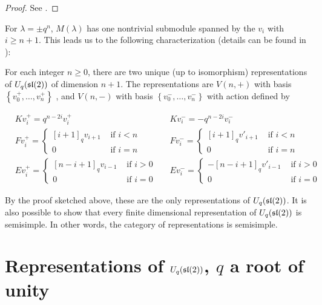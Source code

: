 \begin{proof}
    See \cite{Jantzen1996}.
\end{proof}

For $\lambda = \pm q^{n}$, $M(\lambda)$ has one nontrivial submodule spanned by the $v_i$ with $i \geq n+1$.
This leads us to the following characterization (details can be found in \cite{Jantzen1996}):


For each integer $n \geq 0$, there are two unique (up to isomorphism)
representations of $U_q(\mathfrak{sl}(2))$ of dimension $n+1$. 
The representations are $V(n,+)$ with basis $\left\{ v^+_0, \ldots, v^+_n
\right\}$ , and $V(n,-)$ with basis $\left\{ v^-_0, \ldots, v^-_n \right\}$
with action defined by 

\begin{align*}
    &K v^+_i = q^{n-2i} v^+_i  &
    &K v^-_i = -q^{n-2i} v^-_i \\
    &F v^+_i = \begin{cases} [i+1]_qv_{i+1}& \text{ if $i < n$} \\ 0& \text{ if $i = n$} \end{cases} &
    &F v^-_i = \begin{cases} [i+1]_qv'_{i+1}& \text{ if $i < n$} \\ 0& \text{ if $i = n$} \end{cases} \\
    &E v^+_i = \begin{cases} 
                     [n-i+1]_qv_{i-1}& \text{ if $i > 0$} \\ 
                    0& \text{ if $i = 0$} 
             \end{cases} &
    &E v^-_i = \begin{cases} 
                    -[n-i+1]_q v'_{i-1}& \text{ if $i > 0$} \\ 
                    0& \text{ if $i = 0$} 
             \end{cases}
\end{align*}

By the proof sketched above, these are the only representations of
$U_q(\mathfrak{sl}(2))$. It is also possible to show that every finite dimensional
representation of $U_q(\mathfrak{sl}(2))$ is semisimple. In other words, the category of
representations is semisimple.

\section{Representations of $U_q(\mathfrak{sl}(2))$, $q$ a root of unity}

